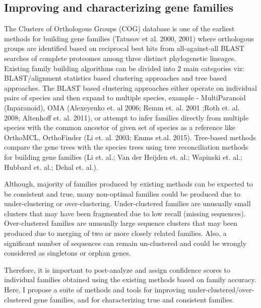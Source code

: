 \documentclass{article}
\begin{document}
		\subsection{Improving and characterizing gene families}
		The Clusters of Orthologous Groups (COG) database is one of the earliest methods for building gene families (Tatusov et al. 2000, 2001) where orthologous groups are identified based on reciprocal best hits from all-against-all BLAST searches of complete proteomes among three distinct phylogenetic lineages. Existing family building algorithms can be divided into 2 main categories viz: BLAST/alignment statistics based clustering approaches and tree based approaches. The BLAST based clustering approaches either operate on individual pairs of species and then expand to multiple species, example - MultiParanoid (Inparanoid), OMA (Alexeyenko et. al 2006; Remm et. al. 2001 ;Roth et. al. 2008; Altenhoff et. al. 2011), or attempt to infer families directly from multiple species with the common ancestor of given set of species as a reference like  OrthoMCL, OrthoFinder (Li et. al. 2003; Emms et.al. 2015). Tree-based methods compare the gene trees with the species trees using tree reconciliation methods for building gene families (Li et. al.; Van der Heijden et. al.; Wapinski et. al.; Hubbard et. al.; Dehal et. al.).
		  
		Although, majority of families produced by existing methods can be expected to be consistent and true, many non-optimal families could be produced due to under-clustering or over-clustering. Under-clustered families are unusually small clusters that may have been fragmented due to low recall (missing sequences). Over-clustered families are unusually large sequence clusters that may been produced due to merging of two or more closely related families. Also, a significant number of sequences can remain un-clustered and could be wrongly considered as singletons or orphan genes. 
		
		Therefore, it is important to post-analyze and assign confidence scores to individual families obtained using the existing methods based on family accuracy. Here, I propose a suite of methods and tools for improving under-clustered/over-clustered gene families, and for characterizing true and consistent families.
		
\end{document}
